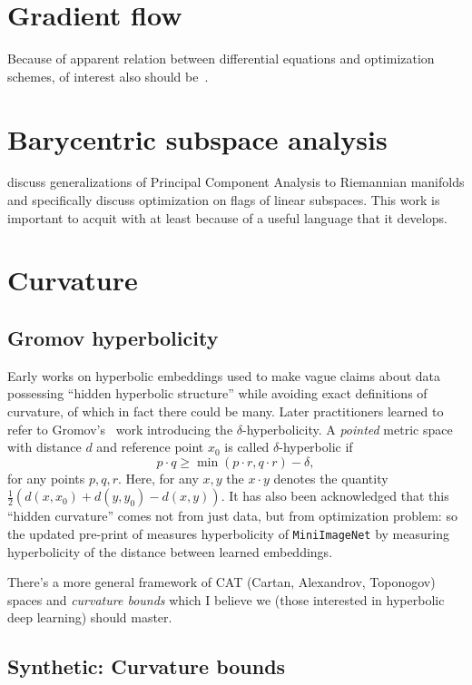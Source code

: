 \section*{Gradient flow}

Because of apparent relation between differential equations and optimization
schemes, of interest also should
be~\citet{ambrosioGradientFlows,ambrosioOTSummerSchool}.

\section*{Barycentric subspace analysis}

\citet{baryPennec} discuss generalizations of Principal Component Analysis to
Riemannian manifolds and specifically discuss optimization on flags of linear
subspaces. This work is important to acquit with at least because of a useful
language that it develops.
\section{Curvature} \label{sec:curvature}

\subsection*{Gromov hyperbolicity}

Early works on hyperbolic embeddings used to make vague claims about data
possessing ``hidden hyperbolic structure'' while avoiding exact definitions of
curvature, of which in fact there could be many. Later practitioners learned
to refer to Gromov's~\cite{gromov} work introducing the \( \delta
\)-hyperbolicity. A \emph{pointed} metric space with distance \( d \) and reference point \( x_0 \) is called \( \delta \)-hyperbolic if
\[ p\cdot q \geq \min(p\cdot r, q\cdot r) - \delta, \]
for any points \( p, q, r \).
Here, for any \(x, y \) the \( x\cdot y \)
denotes the quantity \( \frac12 (d(x, x_0) + d(y, y_0) - d(x, y)) \).
It has also been acknowledged that this ``hidden curvature'' comes not from
just data, but from optimization problem: so the updated pre-print of
\citet{khrulkov} measures hyperbolicity of \texttt{MiniImageNet} by measuring
hyperbolicity of the distance between learned embeddings.

There's a more general framework of CAT (Cartan, Alexandrov, Toponogov) spaces
and \emph{curvature bounds} which I believe we (those interested in hyperbolic
deep learning) should master.

\subsection*{Synthetic: Curvature bounds}

